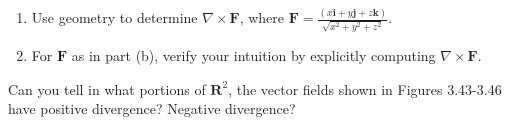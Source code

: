 \documentclass[12pt,letterpaper]{hmcpset}
\newcommand{\vb}{\mathbf}
\begin{document}
\begin{problem}[Colley 3.4.12(b)(c)]
  \begin{enumerate}[label=(\alph*)]
    \addtocounter{enumi}{1}
  \item Use geometry to determine $\nabla \times \vb F$, where $\vb F = \frac{(x\vb i + y\vb j + z\vb k)}{\sqrt{x^2 + y^2 + z^2}}$.
  \item For $\vb F$ as in part (b), verify your intuition by explicitly computing $\nabla \times \vb F$.
  \end{enumerate}
\end{problem}
\clearpage

\begin{problem}[Colley 3.4.13]
  Can you tell in what portions of $\vb R^2$, the vector fields shown in Figures 3.43-3.46 have positive divergence? Negative divergence?
\end{problem}
\end{document}
